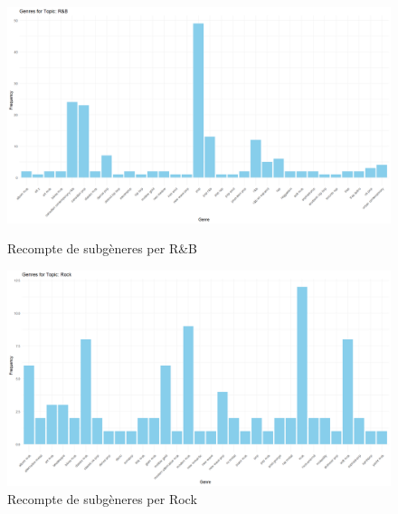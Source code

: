 \begin{figure}[H]
    \centering
    \begin{minipage}{.4\textwidth}
        \centering
        \includegraphics[width=0.95\linewidth]{Images//8_Textual//Genres/R&B_subgenres_freq.png}
    \caption{Recompte de subgèneres per R\&B}
    \label{fig:textual_genres_subrnb}
    \end{minipage}%
    \begin{minipage}{.4\textwidth}
        \centering
        \includegraphics[width=0.95\linewidth]{Images//8_Textual//Genres/Rock_subgenres_freq.png}
    \caption{Recompte de subgèneres per Rock}
    \label{fig:textual_genres_subrock}
    \end{minipage}%
\end{figure}


